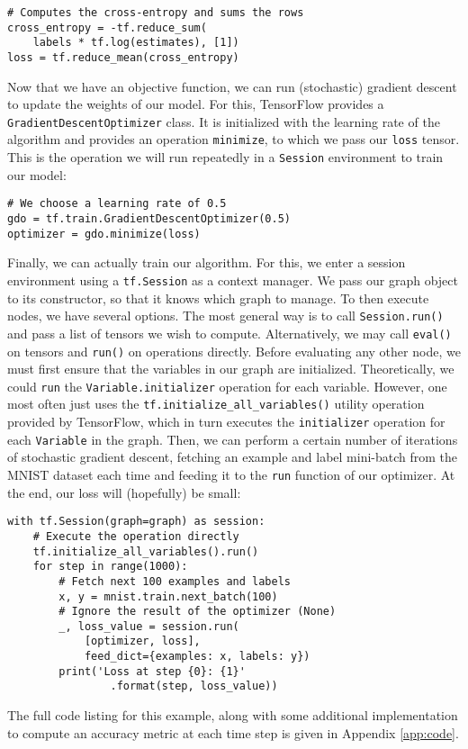 \begin{lstlisting}
# Computes the cross-entropy and sums the rows
cross_entropy = -tf.reduce_sum(
    labels * tf.log(estimates), [1])
loss = tf.reduce_mean(cross_entropy)
\end{lstlisting}

Now that we have an objective function, we can run (stochastic) gradient descent
to update the weights of our model. For this, TensorFlow provides a
\texttt{GradientDescentOptimizer} class. It is initialized with the
learning rate of the algorithm and provides an operation \texttt{minimize}, to
which we pass our \texttt{loss} tensor. This is the operation we will run
repeatedly in a \texttt{Session} environment to train our model:

\begin{lstlisting}
# We choose a learning rate of 0.5
gdo = tf.train.GradientDescentOptimizer(0.5)
optimizer = gdo.minimize(loss)
\end{lstlisting}

Finally, we can actually train our algorithm. For this, we enter a session
environment using a \texttt{tf.Session} as a context manager. We pass our graph
object to its constructor, so that it knows which graph to manage. To then
execute nodes, we have several options. The most general way is to call
\texttt{Session.run()} and pass a list of tensors we wish to
compute. Alternatively, we may call \texttt{eval()} on tensors and
\texttt{run()} on operations directly. Before evaluating any other node, we must
first ensure that the variables in our graph are initialized. Theoretically, we
could \texttt{run} the \texttt{Variable.initializer} operation for each
variable. However, one most often just uses the
\texttt{tf.initialize\_all\_variables()} utility operation provided by
TensorFlow, which in turn executes the \texttt{initializer} operation for each
\texttt{Variable} in the graph. Then, we can perform a certain number of
iterations of stochastic gradient descent, fetching an example and label
mini-batch from the MNIST dataset each time and feeding it to the \texttt{run}
function of our optimizer. At the end, our loss will (hopefully) be small:

\begin{lstlisting}
with tf.Session(graph=graph) as session:
    # Execute the operation directly
    tf.initialize_all_variables().run()
    for step in range(1000):
        # Fetch next 100 examples and labels
        x, y = mnist.train.next_batch(100)
        # Ignore the result of the optimizer (None)
        _, loss_value = session.run(
            [optimizer, loss],
            feed_dict={examples: x, labels: y})
        print('Loss at step {0}: {1}'
                .format(step, loss_value))
\end{lstlisting}

The full code listing for this example, along with some additional
implementation to compute an accuracy metric at each time step is given in
Appendix \ref{app:code}.


